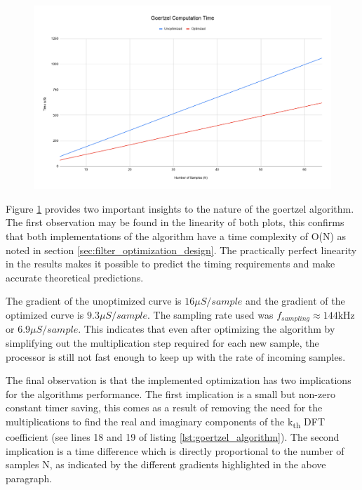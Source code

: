 \begin{figure}[H]
	\centering
	\includegraphics[width=\linewidth]{figures/results/goertzel_filter_speed/goertzel_computation_time.png}
	\label{fig:goertzel_computation_plot}
\end{figure}

Figure \ref{fig:goertzel_computation_plot} provides two important insights to the nature of the goertzel algorithm. The first observation may be found in the linearity of both plots, this confirms that both implementations of the algorithm have a time complexity of O(N) as noted in section \ref{sec:filter_optimization_design}. The practically perfect linearity in the results makes it possible to predict the timing requirements and make accurate theoretical predictions.

The gradient of the unoptimized curve is $16\mu S/sample$ and the gradient of the optimized curve is $9.3\mu S/sample$. The sampling rate used was $f_{sampling} \approx 144$kHz or $6.9\mu S/sample$. This indicates that even after optimizing the algorithm by simplifying out the multiplication step required for each new sample, the processor is still not fast enough to keep up with the rate of incoming samples.

The final observation is that the implemented optimization has two implications for the algorithms performance. The first implication is a small but non-zero constant timer saving, this comes as a result of removing the need for the multiplications to find the real and imaginary components of the k\textsubscript{th} DFT coefficient (see lines 18 and 19 of listing \ref{lst:goertzel_algorithm}). The second implication is a time difference which is directly proportional to the number of samples N, as indicated by the different gradients highlighted in the above paragraph.

